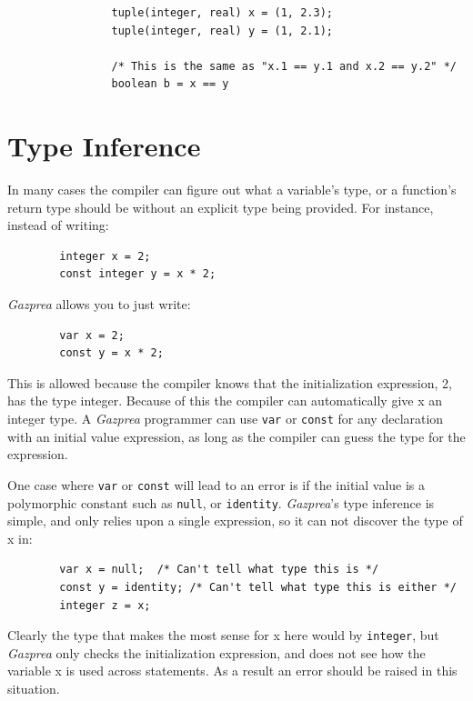 \documentclass{article}
\begin{document}
			\begin{lstlisting}
				tuple(integer, real) x = (1, 2.3);
				tuple(integer, real) y = (1, 2.1);

				/* This is the same as "x.1 == y.1 and x.2 == y.2" */
				boolean b = x == y
			\end{lstlisting}


\section{Type Inference}\label{sec:typeInference}


	In many cases the compiler can figure out what a variable's type, or a function's return type should be without an
	explicit type being provided. For instance, instead of writing:

	\begin{lstlisting}
		integer x = 2;
		const integer y = x * 2;
	\end{lstlisting}

	\textit{Gazprea} allows you to just write:

	\begin{lstlisting}
		var x = 2;
		const y = x * 2;
	\end{lstlisting}

	This is allowed because the compiler knows that the initialization expression, 2, has the type integer. Because of
	this the compiler can automatically give x an integer type. A \textit{Gazprea} programmer can use \texttt{var} or
	\texttt{const} for any declaration with an initial value expression, as long as the compiler can guess the type for
	the expression.

	One case where \texttt{var} or \texttt{const} will lead to an error is if the initial value is a polymorphic
	constant such as \texttt{null}, or \texttt{identity}.  \textit{Gazprea}'s type inference is simple, and only relies
	upon a single expression, so it can not discover the type of x in:

	\begin{lstlisting}
		var x = null;  /* Can't tell what type this is */
		const y = identity; /* Can't tell what type this is either */
		integer z = x;
	\end{lstlisting}

	Clearly the type that makes the most sense for x here would by \texttt{integer}, but \textit{Gazprea} only checks the
	initialization expression, and does not see how the variable x is used across statements. As a result an error
	should be raised in this situation.
\end{document}
